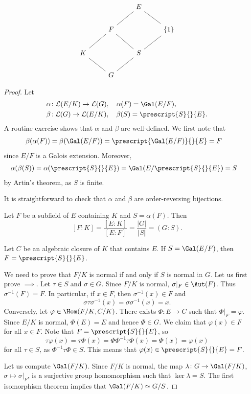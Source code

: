 \[
\begin{tikzcd}
	&& E \\
	& F && {\{1\}} \\
	K && S \\
	& G
	\arrow[no head, from=1-3, to=2-2]
	\arrow[no head, from=2-2, to=3-1]
	\arrow[no head, from=3-1, to=4-2]
	\arrow[no head, from=4-2, to=3-3]
	\arrow[no head, from=2-2, to=3-3]
	\arrow[no head, from=1-3, to=2-4]
	\arrow[no head, from=2-4, to=3-3]
\end{tikzcd}
\]

\begin{proof}
Let 
\begin{align*}
&\alpha\colon \mathcal{L}(E/K)\to \mathcal{L}(G),\quad\alpha(F)=\Gal(E/F),\\
&\beta\colon \mathcal{L}(G)\to \mathcal{L}(E/K),\quad\beta(S)=\prescript{S}{}{E}.
\end{align*}
A routine
exercise shows that $\alpha$ and $\beta$ are well-defined. 
We first note that
\begin{align*}
   &\beta(\alpha(F))=\beta(\Gal(E/F))=\prescript{\Gal(E/F)}{}{E}=F
\end{align*}
since $E/F$ is a Galois extension. Moreover,
\begin{align*}
   &\alpha(\beta(S))=\alpha(\prescript{S}{}{E})=\Gal(E/\prescript{S}{}{E})=S
\end{align*}
by Artin's theorem, as $S$ is finite. 

It is straightforward to check that $\alpha$ and $\beta$ are order-reversing bijections. 

Let $F$ be a subfield of $E$ containing $K$ and 
$S=\alpha(F)$. Then
\[
[F:K]=\frac{[E:K]}{[E:F]}=\frac{|G|}{|S|}=(G:S).
\]

Let $C$ be an algebraic closure of $K$ that contains $E$. 
If $S=\Gal(E/F)$, then $F=\prescript{S}{}{E}$. 

We need to prove that $F/K$ is normal if and only if $S$ is normal in $G$. 
Let us first prove $\implies$. Let $\tau\in S$ and $\sigma\in G$. Since
$F/K$ is normal, $\sigma|_F\in\Aut(F)$. Thus $\sigma^{-1}(F)=F$. In particular, 
if $x\in F$, then $\sigma^{-1}(x)\in F$ and 
\[
\sigma\tau\sigma^{-1}(x)=\sigma\sigma^{-1}(x)=x.
\]
Conversely, let $\varphi\in\Hom(F/K,C/K)$. There exists 
$\Phi\colon E\to C$ such that $\Phi|_F=\varphi$. Since $E/K$ is normal, 
$\Phi(E)=E$ and hence $\Phi\in G$. We claim that $\varphi(x)\in F$ for all $x\in F$. 
Note that $F=\prescript{S}{}{E}$, so
 \[
 \tau\varphi(x)=\tau\Phi(x)=\Phi\Phi^{-1}\tau\Phi(x)=\Phi(x)=\varphi(x)
 \]
 for all $\tau\in S$, as $\Phi^{-1}\tau\Phi\in S$. This means that $\varphi(x)\in\prescript{S}{}{E}=F$. 
 
 Let us compute $\Gal(F/K)$. Since $F/K$ is normal, 
 the map 
 $\lambda\colon G\to\Gal(F/K)$, $\sigma\mapsto\sigma|_F$, 
 is a surjective group homomorphism such that $\ker\lambda=S$. The first isomorphism 
 theorem implies that $\Gal(F/K)\simeq G/S$. 
\end{proof}

